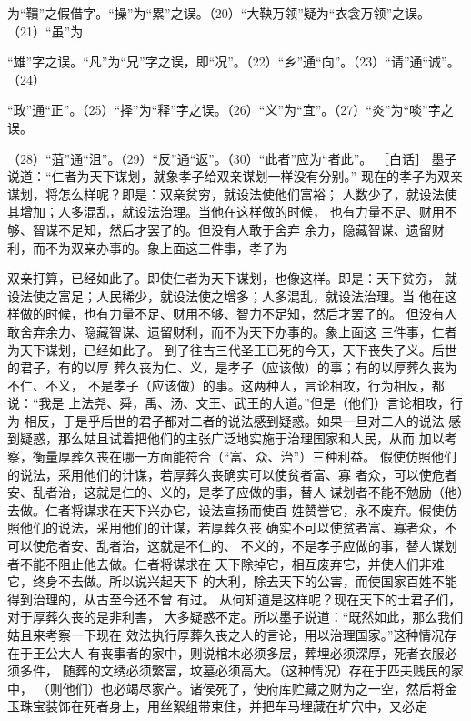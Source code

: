 \documentclass[12pt,UTF8]{ctexbook}
\begin{document}
为“鞼”之假借字。“操”为“累”之误。（20）“大鞅万领”疑为“衣衾万领”之误。（21）“虽”为 

“雄”字之误。“凡”为“兄”字之误，即“况”。（22）“乡”通“向”。（23）“请”通“诚”。（24） 

“政”通“正”。（25）“择”为“释”字之误。（26）“义”为“宜”。（27）“炎”为“啖”字之误。 

（28）“菹”通“沮”。（29）“反”通“返”。（30）“此者”应为“者此”。 
［白话］ 
墨子说道：“仁者为天下谋划，就象孝子给双亲谋划一样没有分别。” 
现在的孝子为双亲谋划，将怎么样呢？即是：双亲贫穷，就设法使他们富裕； 
人数少了，就设法使其增加；人多混乱，就设法治理。当他在这样做的时候， 
也有力量不足、财用不够、智谋不足知，然后才罢了的。但没有人敢于舍弃 
余力，隐藏智谋、遗留财利，而不为双亲办事的。象上面这三件事，孝子为 

双亲打算，已经如此了。即使仁者为天下谋划，也像这样。即是：天下贫穷， 
就设法使之富足；人民稀少，就设法使之增多；人多混乱，就设法治理。当 
他在这样做的时候，也有力量不足、财用不够、智力不足知，然后才罢了的。 
但没有人敢舍弃余力、隐藏智谋、遗留财利，而不为天下办事的。象上面这 
三件事，仁者为天下谋划，已经如此了。 
到了往古三代圣王已死的今天，天下丧失了义。后世的君子，有的以厚 
葬久丧为仁、义，是孝子（应该做）的事；有的以厚葬久丧为不仁、不义， 
不是孝子（应该做）的事。这两种人，言论相攻，行为相反，都说：“我是 
上法尧、舜，禹、汤、文王、武王的大道。”但是（他们）言论相攻，行为 
相反，于是乎后世的君子都对二者的说法感到疑惑。如果一旦对二人的说法 
感到疑惑，那么姑且试着把他们的主张广泛地实施于治理国家和人民，从而 
加以考察，衡量厚葬久丧在哪一方面能符合（“富、众、治”）三种利益。 
假使仿照他们的说法，采用他们的计谋，若厚葬久丧确实可以使贫者富、寡 
者众，可以使危者安、乱者治，这就是仁的、义的，是孝子应做的事，替人 
谋划者不能不勉励（他）去做。仁者将谋求在天下兴办它，设法宣扬而使百 
姓赞誉它，永不废弃。假使仿照他们的说法，采用他们的计谋，若厚葬久丧 
确实不可以使贫者富、寡者众，不可以使危者安、乱者治，这就是不仁的、 
不义的，不是孝子应做的事，替人谋划者不能不阻止他去做。仁者将谋求在 
天下除掉它，相互废弃它，并使人们非难它，终身不去做。所以说兴起天下 
的大利，除去天下的公害，而使国家百姓不能得到治理的，从古至今还不曾 
有过。 
从何知道是这样呢？现在天下的士君子们，对于厚葬久丧的是非利害， 
大多疑惑不定。所以墨子说道：“既然如此，那么我们姑且来考察一下现在 
效法执行厚葬久丧之人的言论，用以治理国家。”这种情况存在于王公大人 
有丧事者的家中，则说棺木必须多层，葬埋必须深厚，死者衣服必须多件， 
随葬的文绣必须繁富，坟墓必须高大。（这种情况）存在于匹夫贱民的家中， 
（则他们）也必竭尽家产。诸侯死了，使府库贮藏之财为之一空，然后将金 
玉珠宝装饰在死者身上，用丝絮组带束住，并把车马埋藏在圹穴中，又必定 
\end{document}
